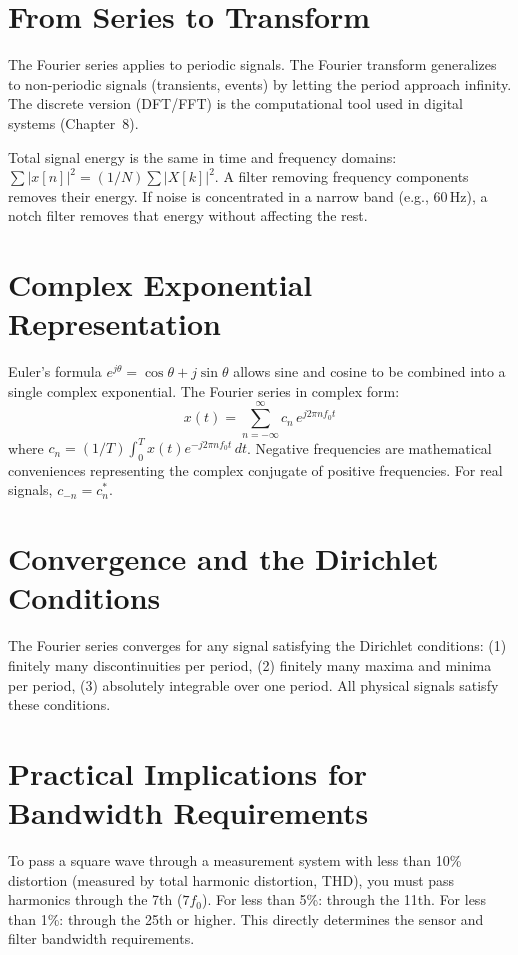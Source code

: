 \documentclass[11pt,letterpaper,twoside,openany]{book}
\begin{document}
\section{From Series to Transform}
The Fourier series applies to periodic signals. The Fourier transform generalizes to non-periodic signals (transients, events) by letting the period approach infinity. The discrete version (DFT/FFT) is the computational tool used in digital systems (Chapter~8).

\begin{tipbox}
Total signal energy is the same in time and frequency domains: $\sum|x[n]|^2 = (1/N)\sum|X[k]|^2$. A filter removing frequency components removes their energy. If noise is concentrated in a narrow band (e.g., 60\,Hz), a notch filter removes that energy without affecting the rest.
\end{tipbox}


\section{Complex Exponential Representation}
Euler's formula $e^{j\theta} = \cos\theta + j\sin\theta$ allows sine and cosine to be combined into a single complex exponential. The Fourier series in complex form:
\begin{equation}
x(t) = \sum_{n=-\infty}^{\infty} c_n \, e^{j2\pi n f_0 t}
\end{equation}
where $c_n = (1/T)\int_0^T x(t)e^{-j2\pi n f_0 t}\,dt$. Negative frequencies are mathematical conveniences representing the complex conjugate of positive frequencies. For real signals, $c_{-n} = c_n^*$.

\section{Convergence and the Dirichlet Conditions}
The Fourier series converges for any signal satisfying the Dirichlet conditions: (1) finitely many discontinuities per period, (2) finitely many maxima and minima per period, (3) absolutely integrable over one period. All physical signals satisfy these conditions.

\section{Practical Implications for Bandwidth Requirements}
To pass a square wave through a measurement system with less than 10\% distortion (measured by total harmonic distortion, THD), you must pass harmonics through the 7th ($7f_0$). For less than 5\%: through the 11th. For less than 1\%: through the 25th or higher. This directly determines the sensor and filter bandwidth requirements.
\end{document}
